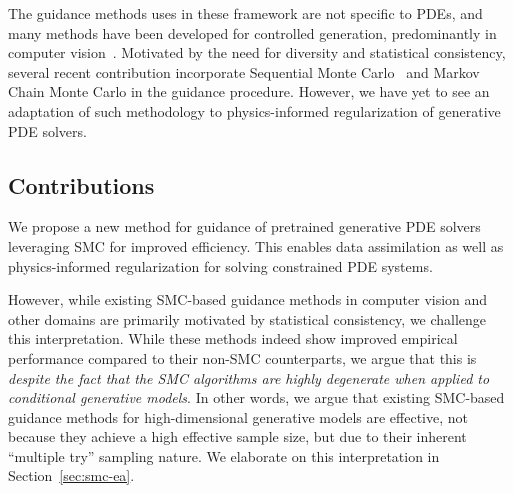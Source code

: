 The guidance methods uses in these framework are not specific to PDEs, and many methods have been developed for controlled generation, predominantly in computer vision~\citep[see,][for recent surveys]{daras2024surveydiffusionmodelsinverse, chung2025diffusionmodelsinverseproblems}. Motivated by the need for diversity and statistical consistency, several recent contribution incorporate Sequential Monte Carlo~\citep[SMC,][]{wu2023-TDS,cardoso2024monte,pmlr-v267-ekstrom-kelvinius25b, zhao2025generativediffusionposteriorsampling} and Markov Chain Monte Carlo \citep{Dang2026inferencetime, janati2025a-MixtureGDM, corenflos2024conditioning, Kalaivanan2025ESSFlow} in the guidance procedure. However, we have yet to see an adaptation of such methodology to physics-informed regularization of generative PDE solvers.

\subsection{Contributions}

We propose a new method for guidance of pretrained generative PDE solvers leveraging SMC for improved efficiency. 
This enables data assimilation as well as physics-informed regularization for solving constrained PDE systems.

However, while existing SMC-based guidance methods in computer vision and other domains \citep{wu2023-TDS, cardoso2024monte, stevens2025sequential, dou2024diffusion, pmlr-v267-ekstrom-kelvinius25b, zhao2025conditional} are primarily motivated by statistical consistency, we challenge this interpretation. While these methods indeed show improved empirical performance compared to their non-SMC counterparts, we argue that this is \emph{despite the fact that the SMC algorithms are highly degenerate when applied to conditional generative models}. In other words, we argue that existing SMC-based guidance methods for high-dimensional generative models are effective, not because they achieve a high effective sample size, but due to their inherent ``multiple try'' sampling nature. We elaborate on this interpretation in Section~\ref{sec:smc-ea}.


